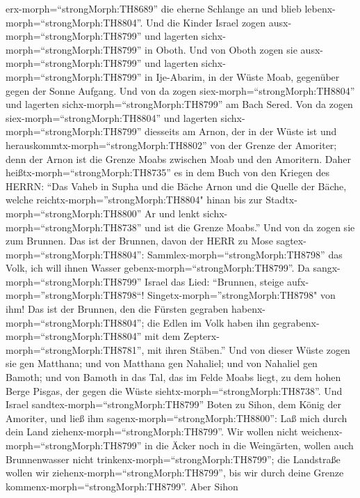 erx-morph=``strongMorph:TH8689'' die eherne Schlange an und blieb
lebenx-morph=``strongMorph:TH8804''.  Und die Kinder Israel
zogen ausx-morph=``strongMorph:TH8799'' und lagerten
sichx-morph=``strongMorph:TH8799'' in Oboth.  Und von Oboth
zogen sie ausx-morph=``strongMorph:TH8799'' und lagerten
sichx-morph=``strongMorph:TH8799'' in Ije-Abarim, in der Wüste Moab,
gegenüber gegen der Sonne Aufgang.  Und von da zogen
siex-morph=``strongMorph:TH8804'' und lagerten
sichx-morph=``strongMorph:TH8799'' am Bach Sered.  Von da
zogen siex-morph=``strongMorph:TH8804'' und lagerten
sichx-morph=``strongMorph:TH8799'' diesseits am Arnon, der in der Wüste
ist und herauskommtx-morph=``strongMorph:TH8802'' von der Grenze der
Amoriter; denn der Arnon ist die Grenze Moabs zwischen Moab und den
Amoritern.  Daher heißtx-morph=``strongMorph:TH8735'' es in
dem Buch von den Kriegen des HERRN: ``Das Vaheb in Supha und die Bäche
Arnon  und die Quelle der Bäche, welche
reichtx-morph=''strongMorph:TH8804" hinan bis zur
Stadtx-morph=``strongMorph:TH8800'' Ar und lenkt
sichx-morph=``strongMorph:TH8738'' und ist die Grenze Moabs.''
 Und von da zogen sie zum Brunnen. Das ist der Brunnen,
davon der HERR zu Mose sagtex-morph=``strongMorph:TH8804'':
Sammlex-morph=``strongMorph:TH8798'' das Volk, ich will ihnen Wasser
gebenx-morph=``strongMorph:TH8799''.  Da
sangx-morph=``strongMorph:TH8799'' Israel das Lied: ``Brunnen, steige
aufx-morph=''strongMorph:TH8798``! Singetx-morph=''strongMorph:TH8798"
von ihm!  Das ist der Brunnen, den die Fürsten gegraben
habenx-morph=``strongMorph:TH8804''; die Edlen im Volk haben ihn
gegrabenx-morph=``strongMorph:TH8804'' mit dem
Zepterx-morph=``strongMorph:TH8781'', mit ihren Stäben.'' Und von dieser
Wüste zogen sie gen Matthana;  und von Matthana gen
Nahaliel; und von Nahaliel gen Bamoth;  und von Bamoth in
das Tal, das im Felde Moabs liegt, zu dem hohen Berge Pisgas, der gegen
die Wüste siehtx-morph=``strongMorph:TH8738''.  Und Israel
sandtex-morph=``strongMorph:TH8799'' Boten zu Sihon, dem König der
Amoriter, und ließ ihm sagenx-morph=``strongMorph:TH8800'':
 Laß mich durch dein Land
ziehenx-morph=``strongMorph:TH8799''. Wir wollen nicht
weichenx-morph=``strongMorph:TH8799'' in die Äcker noch in die
Weingärten, wollen auch Brunnenwasser nicht
trinkenx-morph=``strongMorph:TH8799''; die Landstraße wollen wir
ziehenx-morph=``strongMorph:TH8799'', bis wir durch deine Grenze
kommenx-morph=``strongMorph:TH8799''.  Aber Sihon
